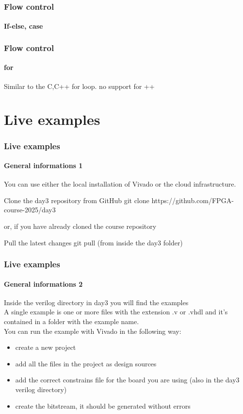 \documentclass{beamer}
\begin{document}
\begin{frame}\frametitle{Flow control}\framesubtitle{If-else,  case}
	
	\vspace{0.5cm}
	
\end{frame}

\begin{frame}\frametitle{Flow control}\framesubtitle{for}
Similar to the C,C++ for loop. no support for ++ \\
\vspace{1cm}

\end{frame}

\section{Live examples}

\begin{frame}\frametitle{Live examples}
\framesubtitle{General informations 1}
You can use either the local installation of Vivado or the cloud infrastructure. \\
\vspace{0.5cm}
\begin{alertblock}{Clone the day3 repository from GitHub}
git clone https://github.com/FPGA-course-2025/day3
\end{alertblock}
or, if you have already cloned the course repository
\begin{alertblock}{Pull the latest changes}
git pull (from inside the day3 folder)
\end{alertblock}
\end{frame}

\begin{frame}\frametitle{Live examples}
\framesubtitle{General informations 2}
Inside the verilog directory in day3 you will find the examples \\
\vspace{0.7cm}
A single example is one or more files with the extension .v or .vhdl
and it's contained in a folder with the example name. \\
\vspace{0.7cm}
You can run the example with Vivado in the following way:
\begin{itemize}
	\item create a new project
	\item add all the files in the project as design sources
	\item add the correct constrains file for the board you are using (also in the day3 verilog directory)
	\item create the bitstream, it should be generated without errors
\end{itemize}
\end{frame}
\end{document}
